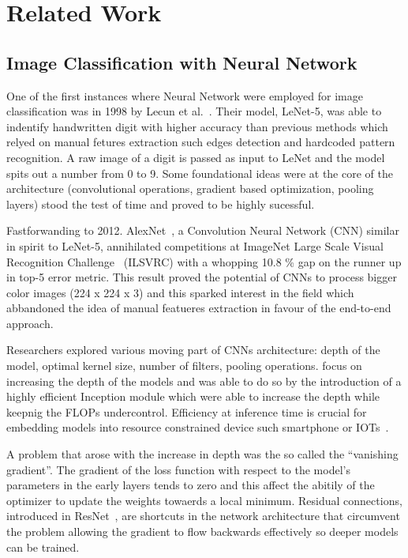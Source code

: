 \chapter{Related Work}
\label{ch:related-work}

\section{Image Classification with Neural Network}
\label{sec:image-classification-with-neural-network}

One of the first instances where Neural Network were employed for image
classification was in 1998 by Lecun et al.~\cite{GradientBasedLecun1998}. Their
model, LeNet-5, was able to indentify handwritten digit with higher accuracy
than previous methods which relyed on manual fetures extraction such edges
detection and hardcoded pattern recognition. A raw image of a digit is passed
as input to LeNet and the model spits out a number from 0 to 9. Some
foundational ideas were at the core of the architecture (convolutional
operations, gradient based optimization, pooling layers) stood the test of time
and proved to be highly sucessful.

Fastforwanding to 2012. AlexNet~\cite{ImagenetClassiKrizhe2017}, a Convolution
Neural Network (CNN) similar in spirit to LeNet-5, annihilated competitions at
ImageNet Large Scale Visual Recognition Challenge~\cite{ImagenetALarDeng2009}
(ILSVRC) with a whopping 10.8 \% gap on the runner up in top-5 error metric.
This result proved the potential of CNNs to process bigger color images (224 x
224 x 3) and this sparked interest in the field which abbandoned the idea of
manual featueres extraction in favour of the end-to-end approach.

Researchers explored various moving part of CNNs architecture: depth of the
model, optimal kernel size, number of filters, pooling operations.
\cite{VeryDeepConvoSimony2014,GoingDeeperWiSzeged2014} focus on increasing the
depth of the models and \cite{GoingDeeperWiSzeged2014} was able to do so by the
introduction of a highly efficient Inception module which were able to increase
the depth while keepnig the FLOPs undercontrol. Efficiency at inference time is
crucial for embedding models into resource constrained device such smartphone or
IOTs~\cite{SqueezenetAleIandol2016, MnasnetPlatfoTanM2018,
MobilenetsEffHoward2017}.

A problem that arose with the increase in depth was the so called the
``vanishing gradient''. The gradient of the loss function with respect to the
model's parameters in the early layers tends to zero and this affect the
abitily of the optimizer to update the weights towaerds a local minimum.
Residual connections, introduced in ResNet~\cite{DeepResidualLHeKa2015}, are
shortcuts in the network architecture that circumvent the problem allowing the
gradient to flow backwards effectively so deeper models can be trained.

